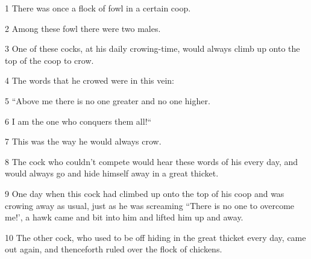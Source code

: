 
{1 There was once a flock of fowl in a certain coop. }

{2 Among these fowl there were two males.}

{3 One of these cocks, at his daily crowing-time, would always climb up
onto the top of the coop to crow. }

{4 The words that he crowed were in this vein: }

{5 ``Above me there is no one greater and no one higher. }

{6 I am the one who conquers them all!`` }

{7 This was the way he would always crow.}

{8 The cock who couldn't compete would hear these words of his every day,
and would always go and hide himself away in a great thicket. }

{9 One day when this cock had climbed up onto the top of his coop and was
crowing away as usual, just as he was screaming ``There is no one to overcome
me!', a hawk came and bit into him and lifted him up and away. }

{10 The other cock, who used to be off hiding in the great thicket every
day, came out again, and thenceforth ruled over the flock of chickens. }


